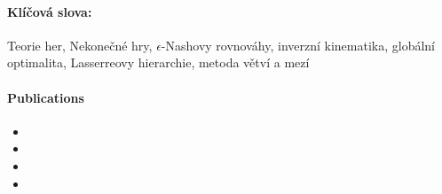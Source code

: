 {{\paragraph{Klíčová slova:} Teorie her, Nekonečné hry, $\epsilon$-Nashovy rovnováhy, inverzní kinematika, globální optimalita, Lasserreovy hierarchie, metoda větví a mezí
}

\pagebreak

\thispagestyle{empty}

\paragraph{Publications}
\begin{itemize}
    \item {}
    \item {}
    \item {}
    \item {}
\end{itemize}

}

